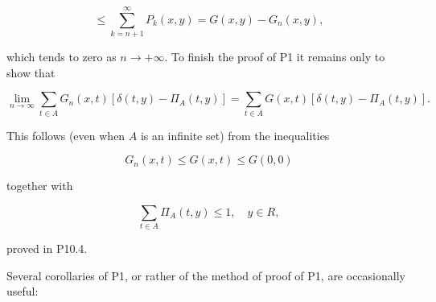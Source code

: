 $$\leq \sum_{k=n+1}^{\infty} P_k(x,y) = G(x,y) - G_n(x,y),$$

which tends to zero as $n \to +\infty$. To finish the proof of P1 it remains only to show that

$$\lim_{n \to \infty} \sum_{t \in A} G_n(x,t)[\delta(t,y) - \Pi_A(t,y)] = \sum_{t \in A} G(x,t)[\delta(t,y) - \Pi_A(t,y)].$$

This follows (even when $A$ is an infinite set) from the inequalities

$$G_n(x,t) \leq G(x,t) \leq G(0,0)$$

together with

$$\sum_{t \in A} \Pi_A(t,y) \leq 1, \quad y \in R,$$

proved in P10.4.

Several corollaries of P1, or rather of the method of proof of P1, are occasionally useful: